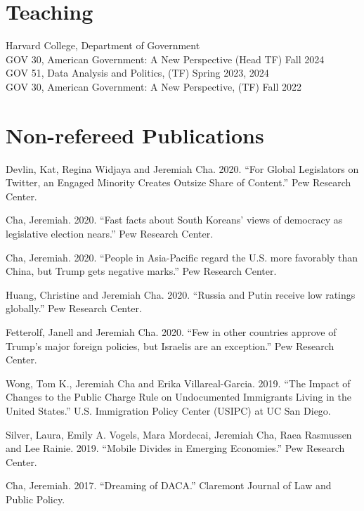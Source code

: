 \documentclass[margin, line]{res}
\begin{document}
\begin{resume}
\section{Teaching}
Harvard College, Department of Government\\
\hspace*{5mm} GOV 30, American Government: A New Perspective (Head TF) \hfill Fall 2024\\
\hspace*{5mm} GOV 51, Data Analysis and Politics, (TF) \hfill Spring 2023, 2024\\
\hspace*{5mm} GOV 30, American Government: A New Perspective,  (TF) \hfill Fall 2022

\section{Non-refereed Publications}
\begin{etaremune}
	\item Devlin, Kat, Regina Widjaya and Jeremiah Cha. 2020. ``For Global Legislators on Twitter, an Engaged Minority Creates Outsize Share of Content.'' Pew Research Center.
	\item Cha, Jeremiah. 2020. ``Fast facts about South Koreans’ views of democracy as legislative election nears.'' Pew Research Center.
	\item Cha, Jeremiah. 2020. ``People in Asia-Pacific regard the U.S. more favorably than China, but Trump gets negative marks.'' Pew Research Center.
	\item Huang, Christine and Jeremiah Cha. 2020. ``Russia and Putin receive low ratings globally.'' Pew Research Center.
	\item Fetterolf, Janell and Jeremiah Cha. 2020. ``Few in other countries approve of Trump’s major foreign policies, but Israelis are an exception.'' Pew Research Center.
	\item Wong, Tom K., Jeremiah Cha and Erika Villareal-Garcia. 2019. ``The Impact of Changes to the Public Charge Rule on Undocumented Immigrants Living in the United States.'' U.S. Immigration Policy Center (USIPC) at UC San Diego.
	\item Silver, Laura, Emily A. Vogels, Mara Mordecai, Jeremiah Cha, Raea Rasmussen and Lee Rainie. 2019. ``Mobile Divides in Emerging Economies.'' Pew Research Center.
	\item Cha, Jeremiah. 2017. ``Dreaming of DACA.'' Claremont Journal of Law and Public Policy.
\end{etaremune}


\end{resume}
\end{document}
